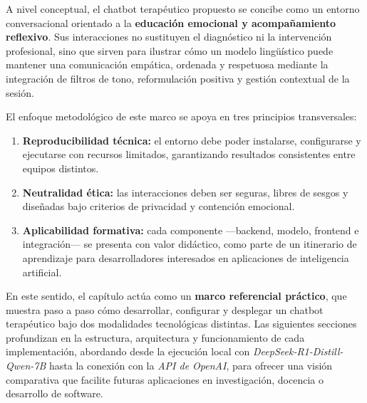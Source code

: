 \documentclass[12pt,a4paper]{report}
\numberwithin{figure}{section}
\begin{document}
\vspace{1em}

A nivel conceptual, el chatbot terapéutico propuesto se concibe como un entorno conversacional orientado a la \textbf{educación emocional y acompañamiento reflexivo}.  
Sus interacciones no sustituyen el diagnóstico ni la intervención profesional, sino que sirven para ilustrar cómo un modelo lingüístico puede mantener una comunicación empática, ordenada y respetuosa mediante la integración de filtros de tono, reformulación positiva y gestión contextual de la sesión.

\vspace{1em}

El enfoque metodológico de este marco se apoya en tres principios transversales:
\begin{enumerate}
    \item \textbf{Reproducibilidad técnica:} el entorno debe poder instalarse, configurarse y ejecutarse con recursos limitados, garantizando resultados consistentes entre equipos distintos.
    \item \textbf{Neutralidad ética:} las interacciones deben ser seguras, libres de sesgos y diseñadas bajo criterios de privacidad y contención emocional.
    \item \textbf{Aplicabilidad formativa:} cada componente —backend, modelo, frontend e integración— se presenta con valor didáctico, como parte de un itinerario de aprendizaje para desarrolladores interesados en aplicaciones de inteligencia artificial.
\end{enumerate}

\vspace{1em}

En este sentido, el capítulo actúa como un \textbf{marco referencial práctico}, que muestra paso a paso cómo desarrollar, configurar y desplegar un chatbot terapéutico bajo dos modalidades tecnológicas distintas.  
Las siguientes secciones profundizan en la estructura, arquitectura y funcionamiento de cada implementación, abordando desde la ejecución local con \textit{DeepSeek-R1-Distill-Qwen-7B} hasta la conexión con la \textit{API de OpenAI}, para ofrecer una visión comparativa que facilite futuras aplicaciones en investigación, docencia o desarrollo de software.

\vspace{1.5em}

\end{document}
